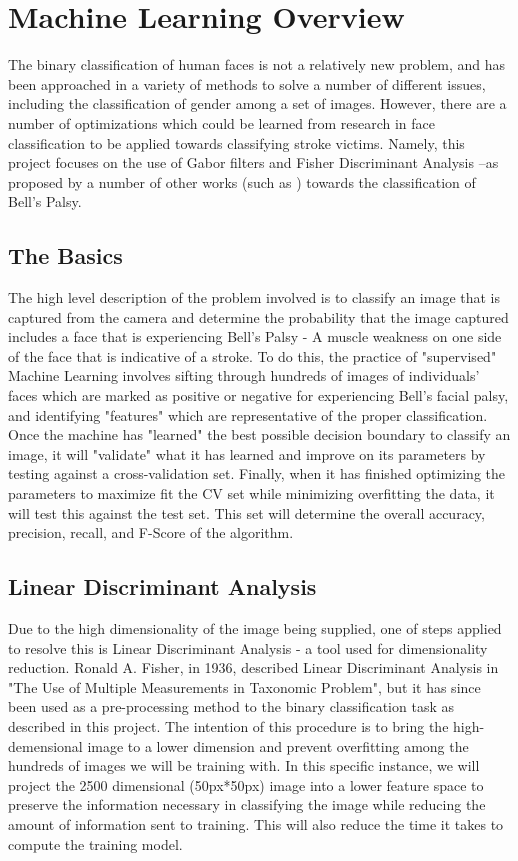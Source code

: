 \documentclass[12pt, conference]{IEEEtran}
\begin{document}
\break

\section{Machine Learning Overview}
The binary classification of human faces is not a relatively new problem, and has been approached in a variety of methods to solve a number of different issues, including the classification of gender among a set of images. However, there are a number of optimizations which could be learned from research in face classification to be applied towards classifying stroke victims. Namely, this project focuses on the use of Gabor filters and Fisher Discriminant Analysis –as proposed by a number of other works (such as \cite{1}) towards the classification of Bell’s Palsy. 

\subsection{The Basics}
The high level description of the problem involved is to classify an image that is captured from the camera and determine the probability that the image captured includes a face that is experiencing Bell's Palsy - A muscle weakness on one side of the face that is indicative of a stroke. To do this, the practice of "supervised" Machine Learning involves sifting through hundreds of images of individuals' faces which are marked as positive or negative for experiencing Bell's facial palsy, and identifying "features" which are representative of the proper classification. Once the machine has "learned" the best possible decision boundary to classify an image, it will "validate" what it has learned and improve on its parameters by testing against a cross-validation set. Finally, when it has finished optimizing the parameters to maximize fit the CV set while minimizing overfitting the data, it will test this against the test set. This set will determine the overall accuracy, precision, recall, and F-Score of the algorithm. 

\subsection{Linear Discriminant Analysis} \label{sec:Basics}
Due to the high dimensionality of the image being supplied, one of steps applied to resolve this is Linear Discriminant Analysis - a tool used for dimensionality reduction. Ronald A. Fisher, in 1936, described Linear Discriminant Analysis in "The Use of Multiple Measurements in Taxonomic Problem"\cite{2}, but it has since been used as a pre-processing method to the binary classification task as described in this project. The intention of this procedure is to bring the high-demensional image to a lower dimension and prevent overfitting among the hundreds of images we will be training with. In this specific instance, we will project the 2500 dimensional (50px*50px) image into a lower feature space to preserve the information necessary in classifying the image while reducing the amount of information sent to training. This will also reduce the time it takes to compute the training model. 
\end{document}
